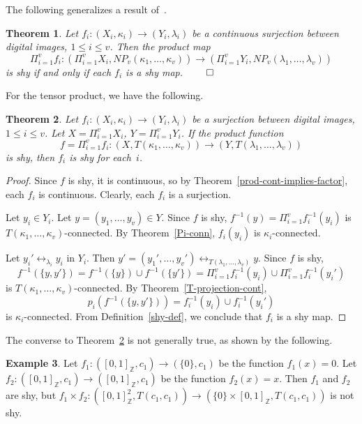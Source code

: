 \documentclass{article}
\theoremstyle{plain}
\newtheorem{thm}{Theorem}
\theoremstyle{definition}
\newtheorem{exl}[thm]{Example}
\numberwithin{thm}{section}
\newcommand{\adj}{\leftrightarrow}
\def\Z{{\mathbb Z}}
\begin{document}
The following generalizes a result
of~\cite{Boxer16}.

\begin{thm}
\label{shy-prod}
\rm{\cite{Boxer16a}}
Let $f_i: (X_i, \kappa_i) \to (Y_i, \lambda_i)$ be
a continuous surjection between digital images,
$1 \leq i \leq v$. Then the product map
\[ \Pi_{i=1}^v f_i : (\Pi_{i=1}^v X_i, NP_v(\kappa_1, \ldots, \kappa_v)) \to (\Pi_{i=1}^v Y_i, NP_v(\lambda_1, \ldots, \lambda_v))
\]
is shy if and only if each $f_i$
is a shy map. $\qed$
\end{thm}

For the tensor product, we have
the following.

\begin{thm}
\label{T-prod-shy-implies-factor}
Let $f_i: (X_i, \kappa_i) \to (Y_i, \lambda_i)$ be
a surjection between digital images,
$1 \leq i \leq v$. Let
$X=\Pi_{i=1}^v X_i$, $Y=\Pi_{i=1}^v Y_i$.
If the product function
\[ f=\Pi_{i=1}^v f_i: (X, T(\kappa_1, \ldots, \kappa_v)) \to (Y, T(\lambda_1, \ldots, \lambda_v))
\]
is shy, then $f_i$ is shy for each~$i$.
\end{thm}

\begin{proof} 
Since $f$ is shy, it is continuous, so by Theorem~\ref{prod-cont-implies-factor}, each $f_i$ is continuous.
Clearly, each $f_i$ is a surjection.

Let $y_i \in Y_i$.
Let $y=(y_1,\ldots,y_v) \in Y$.
Since $f$ is shy, 
$f^{-1}(y)=\Pi_{i=1}^v f_i^{-1}(y_i)$ is $T(\kappa_1,\ldots,\kappa_v)$-connected. By Theorem~\ref{Pi-conn},
$f_i(y_i)$ is $\kappa_i$-connected.

Let $y_i' \adj_{\lambda_i} y_i$ in $Y_i$. Then $y'=(y_1',\ldots,y_v')
\adj_{T(\lambda_1,\ldots,\lambda_v)} y$. Since $f$ is shy,
\[f^{-1}(\{y,y'\})=f^{-1}(\{y\})\cup
  f^{-1}(\{y'\})=
  \Pi_{i=1}^v f_i^{-1}(y_i) \cup
  \Pi_{i=1}^v f_i^{-1}(y_i')
\]
is $T(\kappa_1,\ldots,\kappa_v)$-connected. By
Theorem~\ref{T-projection-cont},
\[p_i(f^{-1}(\{y,y'\}))=f_i^{-1}(y_i) \cup f_i^{-1}(y_i')\]
is $\kappa_i$-connected. From
Definition~\ref{shy-def}, we
conclude that $f_i$ is a shy map.
\end{proof}

The converse to Theorem~\ref{T-prod-shy-implies-factor} is not generally true, as shown by the following.

\begin{exl}
Let $f_1: ([0,1]_{\Z},c_1) \to (\{0\},c_1)$ be the function
$f_1(x)=0$. Let $f_2: ([0,1]_{\Z},c_1) \to ([0,1]_{\Z},c_1)$ be the function
$f_2(x)=x$. Then
$f_1$ and $f_2$ are shy, but
$f_1 \times f_2: ([0,1]_{\Z}^2, T(c_1,c_1)) \to (\{0\} \times [0,1]_{\Z}, T(c_1,c_1))$ is not shy.
\end{exl}
\end{document}
